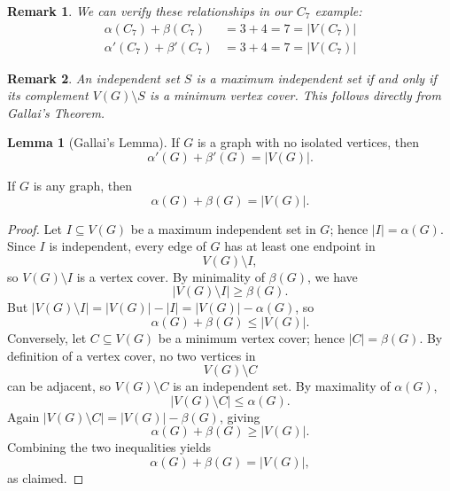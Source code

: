 \documentclass{article}
\newtheorem{remark}{Remark}
\theoremstyle{definition}
\newtheorem{lemma}{Lemma}
\begin{document}
\begin{figure}[h]
\centering
{}
\end{figure}

\begin{remark}
We can verify these relationships in our $C_7$ example:
\begin{align}
\alpha(C_7) + \beta(C_7) &= 3 + 4 = 7 = |V(C_7)| \\
\alpha'(C_7) + \beta'(C_7) &= 3 + 4 = 7 = |V(C_7)|
\end{align}
\end{remark}

\begin{remark}
An independent set $S$ is a maximum independent set if and only if its complement $V(G) \setminus S$ is a minimum vertex cover. This follows directly from Gallai's Theorem.
\end{remark}

\begin{lemma}[Gallai's Lemma]
If $G$ is a graph with no isolated vertices, then
\[\alpha'(G) + \beta'(G) = |V(G)|.\]

If $G$ is any graph, then
\[\alpha(G) + \beta(G) = |V(G)|.\]
\end{lemma}

\begin{proof}
Let $I\subseteq V(G)$ be a maximum independent set in $G$; hence $|I| = \alpha(G)$.  Since $I$ is independent, every edge of $G$ has at least one endpoint in
\[
V(G)\setminus I,
\]
so $V(G)\setminus I$ is a vertex cover.  By minimality of $\beta(G)$, we have
\[
|V(G)\setminus I| \geq \beta(G).
\]
But $|V(G)\setminus I| = |V(G)| - |I| = |V(G)| - \alpha(G)$, so
\[
\alpha(G) + \beta(G) \leq |V(G)|.
\]
Conversely, let $C\subseteq V(G)$ be a minimum vertex cover; hence $|C| = \beta(G)$.  By definition of a vertex cover, no two vertices in
\[
V(G)\setminus C
\]
can be adjacent, so $V(G)\setminus C$ is an independent set.  By maximality of $\alpha(G)$,
\[
|V(G)\setminus C| \leq \alpha(G).
\]
Again $|V(G)\setminus C| = |V(G)| - \beta(G)$, giving
\[
\alpha(G) + \beta(G) \geq |V(G)|.
\]
Combining the two inequalities yields
\[
\alpha(G) + \beta(G) = |V(G)|,
\]
as claimed.
\end{proof}
\end{document}
